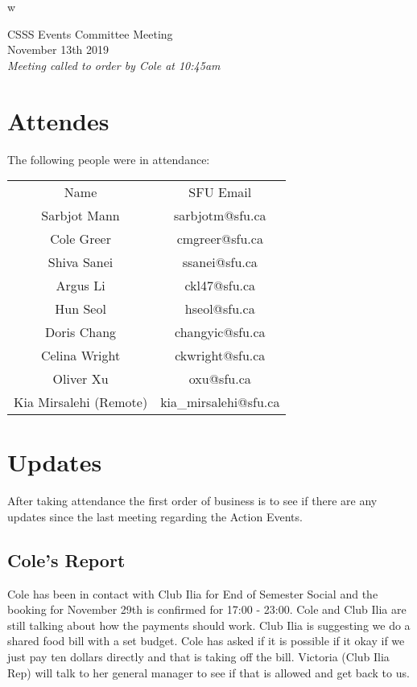 \documentclass[12pt]{article}
\begin{document}
w\begin{center}
CSSS Events Committee Meeting \\
November 13th 2019 \\
\em Meeting called to order by Cole at 10:45am
\end{center}
\tableofcontents
\thispagestyle{empty}
\clearpage
{} 

\newpage 
\section{Attendes} \label{sec:Introduction}
The following people were in attendance: 
\begin{table}[h]
\centering
\begin{tabular}{cc}
Name                   & SFU Email             \\
Sarbjot Mann           & sarbjotm@sfu.ca       \\
Cole Greer             & cmgreer@sfu.ca        \\
Shiva Sanei            & ssanei@sfu.ca         \\
Argus Li               & ckl47@sfu.ca          \\
Hun Seol               & hseol@sfu.ca          \\
Doris Chang            & changyic@sfu.ca       \\
Celina Wright          & ckwright@sfu.ca       \\
Oliver Xu              & oxu@sfu.ca            \\
Kia Mirsalehi (Remote) & kia\_mirsalehi@sfu.ca
\end{tabular}
\end{table}

\section{Updates} \label{sec:Updates}

\noindent After taking attendance the first order of business is to see if there are any updates since the last meeting regarding the Action Events.

\subsection{Cole's Report}
\noindent Cole has been in contact with Club Ilia for End of Semester Social and the booking for November 29th is confirmed for 17:00 - 23:00. Cole and Club Ilia are still talking about how the payments should work. Club Ilia is suggesting we do a shared food bill with a set budget. Cole has asked if it is possible if it okay if we just pay ten dollars directly and that is taking off the bill. Victoria (Club Ilia Rep) will talk to her general manager to see if that is allowed and get back to us. 
\end{document}
